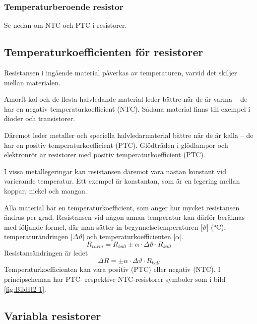 \subsubsection{Temperaturberoende resistor}

Se nedan om NTC och PTC i resistorer.

\subsection{Temperaturkoefficienten för resistorer}

Resistansen i ingående material påverkas av temperaturen, varvid det skiljer
mellan materialen.

Amorft kol och de flesta halvledande material leder bättre när de är varma -- de
har en negativ temperaturkoefficient (NTC). Sådana material finns till exempel i
dioder och transistorer.

Däremot leder metaller och speciella halvledarmaterial bättre när de är kalla
-- de har en positiv temperaturkoefficient (PTC). Glödtråden i glödlampor och
elektronrör är resistorer med positiv temperaturkoefficient (PTC).

I vissa metallegeringar kan resistansen däremot vara nästan konstant vid varierande 
temperatur. Ett exempel är konstantan, som är en legering mellan koppar, nickel 
och mangan.

Alla material har en temperaturkoefficient, som anger hur mycket resistansen
ändras per grad. Resistansen vid någon annan temperatur kan därför beräknas med
följande formel, där man sätter in begynnelsetemperaturen [\(\vartheta\)]
(\si{\degreeCelsius}), temperaturändringen [\(\Delta \vartheta\)] och
temperaturkoefficienten [\(\alpha\)].
\[R_{varm} = R_{kall} \pm \alpha \cdot \Delta \vartheta \cdot R_{kall}\]
Resistansändringen är ledet
\[ \Delta R = \pm \alpha \cdot \Delta \vartheta \cdot R_{kall}\]
Temperaturkoefficienten kan vara positiv (PTC) eller negativ (NTC).
I principscheman har PTC- respektive NTC-resistorer symboler som i bild \ref{fig:BildII2-1}.


\subsection{Variabla resistorer}

